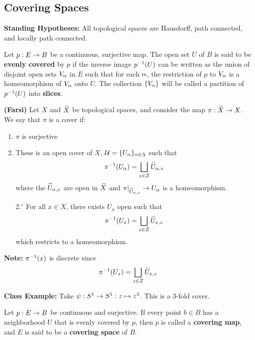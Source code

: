 \subsection{Covering Spaces}\nl
\setcounter{section}{53}
\setcounter{thm}{0}

\textbf{Standing Hypotheses:} All topological spaces are Hausdorff, path connected, and locally path connected.

\vs

\dfn Let $p: E\rightarrow B$ be a continuous, surjective map. The open set $U$ of $B$ is said to be \textbf{evenly covered} by $p$ if the inverse image $p^{-1}(U)$ can be written as the union of disjoint open sets $V_\alpha$ in $E$ such that for each $\alpha$, the restriction of $p$ to $V_\alpha$ is a homeomorphism of $V_\alpha$ onto $U$. The collection $\{V_\alpha\}$ will be called a partition of $p^{-1}(U)$ into \textbf{slices}.

\vs

\dfn \textbf{(Farsi)} Let $X$ and $\widetilde X$ be topological spaces, and consider the map $\pi:\widetilde X\rightarrow  X$. We say that $\pi$ is a cover if:
\begin{enumerate}
    \item $\pi$ is surjective
    \item These is an open cover of $X$, $\mathcal{U} = \{U_\alpha\}_{\alpha\in \Lambda}$ such that
    \[\pi^{-1}(U_\alpha) = \bigsqcup_{z\in Z}\widetilde U_{\alpha, z}\]
    where the $\widetilde U_{\alpha, z}$ are open in $\widetilde X$ and $\pi|_{\widetilde U_{\alpha, z}}\rightarrow U_\alpha$ is a homeomorphism.
    \item[2.$^\prime$] For all $x\in X$, there exists $U_x$ open such that
    \[\pi^{-1}(U_x) = \bigsqcup_{z\in Z} \widetilde U_{x, z}\]
    which restricts to a homeomorphism.
\end{enumerate}

\vs

\textbf{Note:} $\pi^{-1}(x)$ is discrete since
\[\pi^{-1}(U_x) = \bigsqcup_{z\in Z} \widetilde U_{x, z}\]

\vs

\textbf{Class Example:} Take $\psi:S^1\rightarrow S^1: z\mapsto z^3$. This is a 3-fold cover.

\vs

\dfn Let $p:E\rightarrow B$ be continuous and surjective. If every point $b\in B$ has a neighborhood $U$ that is evenly covered by $p$, then $p$ is called a \textbf{covering map}, and $E$ is said to be a \textbf{covering space} of $B$.

